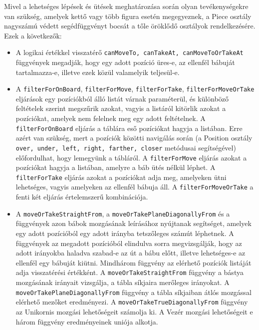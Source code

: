 \documentclass[12pt, twoside]{report}
\begin{document}
Mivel a lehetséges lépések és ütések meghatározása során olyan tevékenységekre van szükség, amelyek kettő vagy több figura esetén megegyeznek, a Piece osztály nagyszámú védett segédfüggvényt bocsát a tőle öröklődő osztályok rendelkezésére. Ezek a következők:
\begin{itemize}
	\item A logikai értékkel visszatérő {\tt canMoveTo, canTakeAt, canMoveToOrTakeAt} függvények megadják, hogy egy adott pozíció üres-e, az ellenfél bábuját tartalmazza-e, illetve ezek közül valamelyik teljesül-e.
	\item A {\tt filterForOnBoard}, {\tt filterForMove}, {\tt filterForTake}, {\tt filterForMoveOrTake} eljárások egy pozíciókból álló listát várnak paraméterül, és különböző feltételek szerint megszűrik azokat, vagyis a listáról kitörlik azokat a pozíciókat, amelyek nem felelnek meg egy adott feltételnek. 
		\subitem A {\tt filterForOnBoard} eljárás a táblára eső pozíciókat hagyja a listában. Erre azért van szükség, mert a pozíciók közötti navigálás során (a Position osztály {\tt over, under, left, right, farther, closer} metódusai segítségével) előfordulhat, hogy lemegyünk a tábláról. 
		\subitem A {\tt filterForMove} eljárás azokat a pozíciókat hagyja a listában, amelyre a báb ütés nélkül léphet.
		\subitem A {\tt filterForTake} eljárás azokat a pozíciókat adja meg, amelyeken ütni lehetséges, vagyis amelyeken az ellenfél bábuja áll.
		\subitem A {\tt filterForMoveOrTake} a fenti két eljárás értelemszerű kombinációja.
	\item A {\tt moveOrTakeStraightFrom}, a {\tt moveOrTakePlaneDiagonallyFrom} és a  függvények azon bábok mozgásának leírásához nyújtanak segítséget, amelyek egy adott pozícióból egy adott irányba tetszőleges számút léphetnek. A függvények az megadott pozícióból elindulva sorra megvizsgálják, hogy az adott irányokba haladva szabad-e az út a bábu előtt, illetve lehetséges-e az ellenfél egy bábuját kiütni. Mindhárom függvény az elérhető pozíciók listáját adja visszatérési értékként. A {\tt moveOrTakeStraightFrom} függvény a bástya mozgásának irányait vizsgálja, a tábla síkjaira merőleges irányokat. A {\tt moveOrTakePlaneDiagonallyFrom} függvény a tábla síkjaiban átlós mozgással elérhető mezőket eredményezi. A {\tt moveOrTakeTrueDiagonallyFrom} függvény az Unikornis mozgási lehetőségeit számolja ki. A Vezér mozgási lehetőségeit e három függvény eredményeinek uniója alkotja.
	

\end{itemize}
\end{document}
